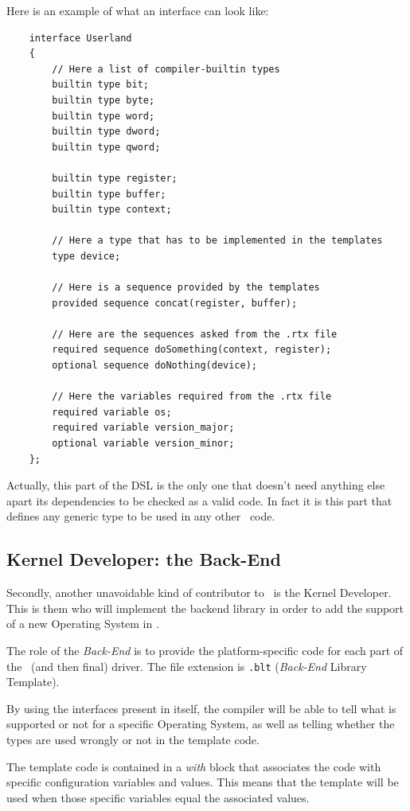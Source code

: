 \documentclass[american]{rtxreport}
\begin{document}
Here is an example of what an interface can look like:
\begin{lstlisting}
    interface Userland
    {
        // Here a list of compiler-builtin types
        builtin type bit;
        builtin type byte;
        builtin type word;
        builtin type dword;
        builtin type qword;

        builtin type register;
        builtin type buffer;
        builtin type context;

        // Here a type that has to be implemented in the templates
        type device;

        // Here is a sequence provided by the templates
        provided sequence concat(register, buffer);

        // Here are the sequences asked from the .rtx file
        required sequence doSomething(context, register);
        optional sequence doNothing(device);

        // Here the variables required from the .rtx file
        required variable os;
        required variable version_major;
        optional variable version_minor;
    };
\end{lstlisting}

Actually, this part of the DSL is the only one that doesn't need anything else
apart its dependencies to be checked as a valid code. In fact it is this part
that defines any generic type to be used in any other \rtx\ code.

\subsection{Kernel Developer: the Back-End}
\lstset{language=blt}

Secondly, another unavoidable kind of contributor to \rtx\ is the Kernel
Developer. This is them who will implement the backend library in order to add
the support of a new Operating System in \rtx.

The role of the \emph{Back-End} is to provide the platform-specific code for
each part of the \rtx\ (and then final) driver. The file extension is
\texttt{.blt} (\emph{Back-End} Library Template).

By using the interfaces present in itself, the compiler will be able to tell
what is supported or not for a specific Operating System, as well as telling
whether the types are used wrongly or not in the template code.

The template code is contained in a \emph{with} block that associates the code
with specific configuration variables and values. This means that the template
will be used when those specific variables equal the associated values.
\end{document}
